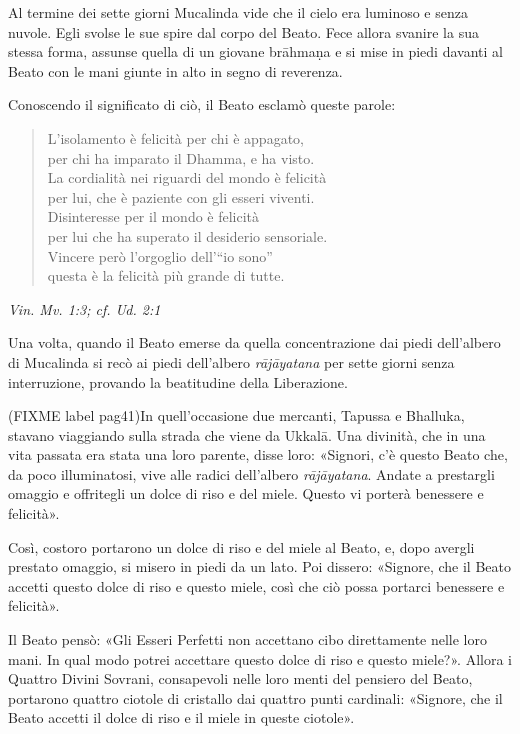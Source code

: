 Al termine dei sette giorni Mucalinda vide che il cielo era luminoso e
senza nuvole. Egli svolse le sue spire dal corpo del Beato. Fece allora
svanire la sua stessa forma, assunse quella di un giovane brāhmaṇa e si
mise in piedi davanti al Beato con le mani giunte in alto in segno di
reverenza.


Conoscendo il significato di ciò, il Beato esclamò queste parole:


\begin{quotation}
L’isolamento è felicità per chi è appagato, \\
per chi ha imparato il Dhamma, e ha visto. \\
La cordialità nei riguardi del mondo è felicità \\
per lui, che è paziente con gli esseri viventi. \\
Disinteresse per il mondo è felicità \\
per lui che ha superato il desiderio sensoriale. \\
Vincere però l’orgoglio dell’“io sono” \\
questa è la felicità più grande di tutte.
\end{quotation}

\emph{Vin. Mv. 1:3; cf. Ud. 2:1}


Una volta, quando il Beato emerse da quella concentrazione dai piedi
dell’albero di Mucalinda si recò ai piedi dell’albero \emph{rājāyatana} per
sette giorni senza interruzione, provando la beatitudine della
Liberazione.


(FIXME label pag41)In quell’occasione due mercanti, Tapussa e Bhalluka, stavano viaggiando
sulla strada che viene da Ukkalā. Una divinità, che in una vita passata
era stata una loro parente, disse loro: «Signori, c’è questo Beato che,
da poco illuminatosi, vive alle radici dell’albero \emph{rājāyatana}. Andate
a prestargli omaggio e offritegli un dolce di riso e del miele. Questo
vi porterà benessere e felicità».


Così, costoro portarono un dolce di riso e del miele al Beato, e, dopo
avergli prestato omaggio, si misero in piedi da un lato. Poi dissero:
«Signore, che il Beato accetti questo dolce di riso e questo miele, così
che ciò possa portarci benessere e felicità».


Il Beato pensò: «Gli Esseri Perfetti non accettano cibo direttamente
nelle loro mani. In qual modo potrei accettare questo dolce di riso e
questo miele?». Allora i Quattro Divini Sovrani, consapevoli nelle loro
menti del pensiero del Beato, portarono quattro ciotole di cristallo dai
quattro punti cardinali: «Signore, che il Beato accetti il dolce di riso
e il miele in queste ciotole».


